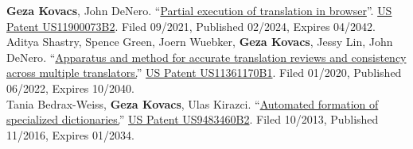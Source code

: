 
{\small \textbf{Geza Kovacs}, John DeNero}. ``\href{https://patents.google.com/patent/US20230070302A1}{Partial execution of translation in browser}''. \hypersetup{urlcolor=black}\href{https://patents.google.com/patent/US20230070302A1}{US Patent US11900073B2}\hypersetup{urlcolor=linkcol}. Filed 09/2021, Published 02/2024, Expires 04/2042.\\

{\small Aditya Shastry, Spence Green, Joern Wuebker,} \textbf{Geza Kovacs}, {\small Jessy Lin, John DeNero}. ``\href{https://patents.google.com/patent/US11361170B1}{Apparatus and method for accurate translation reviews and consistency across multiple translators.}'' \hypersetup{urlcolor=black}\href{https://patents.google.com/patent/US11361170B1}{US Patent US11361170B1}\hypersetup{urlcolor=linkcol}. Filed 01/2020, Published 06/2022, Expires 10/2040.\\

{\small Tania Bedrax-Weiss,} \textbf{Geza Kovacs}, {\small Ulas Kirazci.} ``\href{https://patents.google.com/patent/US9483460B2}{Automated formation of specialized dictionaries.}'' \hypersetup{urlcolor=black}\href{https://patents.google.com/patent/US9483460B2}{US Patent US9483460B2}\hypersetup{urlcolor=linkcol}. Filed 10/2013, Published 11/2016, Expires 01/2034.\\

